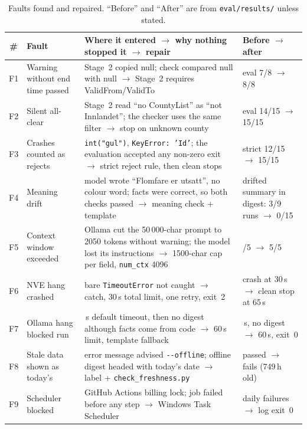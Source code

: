 \documentclass{article}
\newcommand{\code}[1]{\texttt{#1}}
\begin{document}
\begin{table}[htbp]
\centering
\small
\caption{Faults found and repaired. ``Before'' and ``After'' are from \code{eval/results/} unless stated.}
\label{tab:faults}
\begin{tabularx}{\textwidth}{@{}c >{\raggedright\arraybackslash}p{3.3cm} >{\raggedright\arraybackslash}X >{\raggedright\arraybackslash}p{2.9cm}@{}}
\toprule
\textbf{\#} & \textbf{Fault} & \textbf{Where it entered $\rightarrow$ why nothing stopped it $\rightarrow$ repair} & \textbf{Before $\rightarrow$ after} \\
\midrule
F1 & Warning without end time passed & Stage~2 copied null; check compared null with null $\rightarrow$ Stage~2 requires ValidFrom/ValidTo & eval 7/8 $\rightarrow$ 8/8 \\
F2 & Silent all-clear & Stage~2 read ``no CountyList'' as ``not Innlandet''; the checker uses the same filter $\rightarrow$ stop on unknown county & eval 14/15 $\rightarrow$ 15/15 \\
F3 & Crashes counted as rejects & \code{int("gul")}, \code{KeyError: 'Id'}; the evaluation accepted any non-zero exit $\rightarrow$ strict reject rule, then clean stops & strict 12/15 $\rightarrow$ 15/15 \\
F4 & Meaning drift & model wrote ``Flomfare er utsatt'', no colour word; facts were correct, so both checks passed $\rightarrow$ meaning check + template & drifted summary in digest: 3/9 runs $\rightarrow$ 0/15 \\
F5 & Context window exceeded & Ollama cut the 50\,000-char prompt to 2050 tokens without warning; the model lost its instructions $\rightarrow$ 1500-char cap per field, \code{num\_ctx} 4096 & 0/5 $\rightarrow$ 5/5 \\
F6 & NVE hang crashed & bare \code{TimeoutError} not caught $\rightarrow$ catch, 30\,s total limit, one retry, exit~2 & crash at 30\,s $\rightarrow$ clean stop at 65\,s \\
F7 & Ollama hang blocked run & 300\,s default timeout, then no digest although facts come from code $\rightarrow$ 60\,s limit, template fallback & 300\,s, no digest $\rightarrow$ 60\,s, exit~0 \\
F8 & Stale data shown as today's & error message advised \code{-{}-offline}; offline digest headed with today's date $\rightarrow$ label + \code{check\_freshness.py} & passed $\rightarrow$ fails (749\,h old) \\
F9 & Scheduler blocked & GitHub Actions billing lock; job failed before any step $\rightarrow$ Windows Task Scheduler & daily failures $\rightarrow$ log exit~0 \\
\bottomrule
\end{tabularx}
\end{table}
\end{document}
